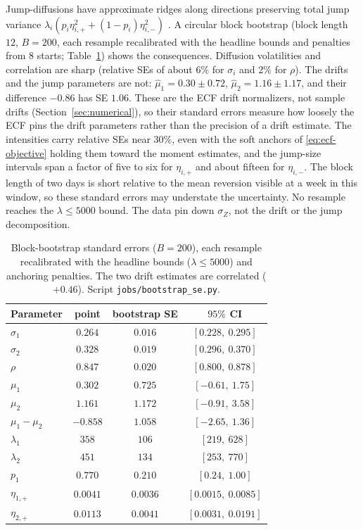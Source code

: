 \documentclass[11pt]{article}
\theoremstyle{plain}
\theoremstyle{definition}
\theoremstyle{remark}
\begin{document}
Jump-diffusions have approximate ridges along directions preserving total jump variance
$\lambda_i(p_i\eta_{i,+}^2+(1-p_i)\eta_{i,-}^2)$ \citep{RamezaniZeng2007}. A circular block
bootstrap (block length $12$, $B=200$, each resample recalibrated with the headline bounds and
penalties from $8$ starts; Table~\ref{tab:bootstrap}) shows the consequences. Diffusion volatilities
and correlation are sharp (relative SEs of about $6\%$ for $\sigma_i$ and $2\%$ for $\rho$). The drifts and the jump parameters are not:
$\hat\mu_1=0.30\pm0.72$, $\hat\mu_2=1.16\pm1.17$, and their difference $-0.86$ has SE $1.06$.
These are the ECF drift normalizers, not sample drifts (Section~\ref{sec:numerical}), so their
standard errors measure how loosely the ECF pins the drift parameters rather than the precision of a
drift estimate. The intensities carry relative SEs near $30\%$, even with the soft
anchors of \eqref{eq:ecf-objective} holding them toward the moment estimates, and the jump-size
intervals span a factor of five to six for $\eta_{i,+}$ and about fifteen for $\eta_{i,-}$. The block
length of two days is short relative to the mean reversion visible at a week in this window, so these
standard errors may understate the uncertainty. No resample reaches the $\lambda\le5000$ bound. The data
pin down $\sigma_Z$, not the drift or the jump decomposition.

\begin{table}[ht]
\centering\small
\begin{tabular}{lccc}
\toprule
Parameter & point & bootstrap SE & $95\%$ CI \\
\midrule
$\sigma_1$ & $0.264$ & $0.016$ & $[0.228,\ 0.295]$ \\
$\sigma_2$ & $0.328$ & $0.019$ & $[0.296,\ 0.370]$ \\
$\rho$     & $0.847$ & $0.020$ & $[0.800,\ 0.878]$ \\
$\mu_1$    & $0.302$ & $0.725$ & $[-0.61,\ 1.75]$ \\
$\mu_2$    & $1.161$ & $1.172$ & $[-0.91,\ 3.58]$ \\
$\mu_1-\mu_2$ & $-0.858$ & $1.058$ & $[-2.65,\ 1.36]$ \\
$\lambda_1$ & $358$ & $106$ & $[219,\ 628]$ \\
$\lambda_2$ & $451$ & $134$ & $[253,\ 770]$ \\
$p_1$      & $0.770$ & $0.210$ & $[0.24,\ 1.00]$ \\
$\eta_{1,+}$ & $0.0041$ & $0.0036$ & $[0.0015,\ 0.0085]$ \\
$\eta_{2,+}$ & $0.0113$ & $0.0041$ & $[0.0031,\ 0.0191]$ \\
\bottomrule
\end{tabular}
\caption{Block-bootstrap standard errors ($B=200$), each resample recalibrated with the headline
bounds ($\lambda\le5000$) and anchoring penalties. The two drift estimates are correlated ($+0.46$).
Script \texttt{jobs/bootstrap\_se.py}.}
\label{tab:bootstrap}
\end{table}
\end{document}
